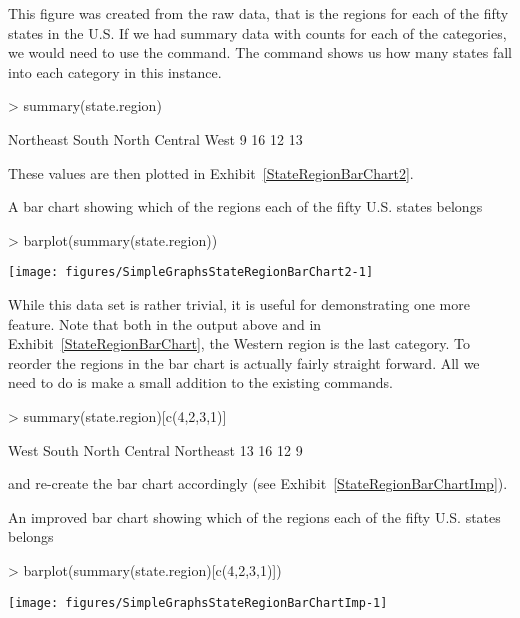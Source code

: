 This figure was created from the raw data, that is the regions for each of the fifty states in the U.S. If we had summary data with counts for each of the categories, we would need to use the  command. The  command shows us how many states fall into each category in this instance.
\begin{Schunk}
\begin{Sinput}
> summary(state.region)
\end{Sinput}
\begin{Soutput}
    Northeast         South North Central          West 
            9            16            12            13 
\end{Soutput}
\end{Schunk}
These values are then plotted in Exhibit~\ref{StateRegionBarChart2}.
\begin{exhibit}
\begin{center}
\caption{A bar chart showing which of the regions each of the fifty U.S. states belongs}
\label{StateRegionBarChart2}
\begin{Schunk}
\begin{Sinput}
> barplot(summary(state.region))
\end{Sinput}

\texttt{[image: figures/SimpleGraphsStateRegionBarChart2-1]} \end{Schunk}
\end{center}
\end{exhibit}

While this data set is rather trivial, it is useful for demonstrating one more feature. Note that both in the output above and in Exhibit~\ref{StateRegionBarChart}, the Western region is the last category. To reorder the regions in the bar chart is actually fairly straight forward. All we need to do is make a small addition to the existing commands.
\begin{Schunk}
\begin{Sinput}
> summary(state.region)[c(4,2,3,1)]
\end{Sinput}
\begin{Soutput}
         West         South North Central     Northeast 
           13            16            12             9 
\end{Soutput}
\end{Schunk}
and re-create the bar chart accordingly (see Exhibit~\ref{StateRegionBarChartImp}).
\begin{exhibit}
\begin{center}
\caption{An improved bar chart showing which of the regions each of the fifty U.S. states belongs}
\label{StateRegionBarChartImp}
\begin{Schunk}
\begin{Sinput}
> barplot(summary(state.region)[c(4,2,3,1)])
\end{Sinput}

\texttt{[image: figures/SimpleGraphsStateRegionBarChartImp-1]} \end{Schunk}
\end{center}
\end{exhibit}

